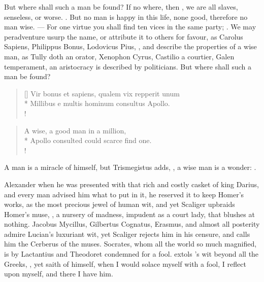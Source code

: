 But where shall such a man be found? If no where, then , we
are all slaves, senseless, or worse. . But no man is
happy in this life, none good, therefore no man wise. --- For one virtue you shall find ten vices in the same party;
. We may peradventure usurp the name,
or attribute it to others for favour, as Carolus Sapiens, Philippus
Bonus, Lodovicus Pius, \etc{}, and describe the properties of a wise man,
as Tully doth an orator, Xenophon Cyrus, Castilio a courtier, Galen
temperament, an aristocracy is described by politicians. But where
shall such a man be found?
%
\begin{latin}
\settowidth{\versewidth}{Vir bonus et sapiens, qualem vix repperit unum}
\begin{verse}[\versewidth]
Vir bonus et sapiens, qualem vix repperit unum\\*
Millibus e multis hominum consultus Apollo.\\!
\end{verse}
\end{latin}
\translationrule
\begin{verse}
A wise, a good man in a million,\\*
Apollo consulted could scarce find one.\\!
\end{verse}

A man is a miracle of himself, but Trismegistus adds, , a wise man is a wonder: .

Alexander when he was presented with that rich and costly casket of
king Darius, and every man advised him what to put in it, he reserved
it to keep Homer's works, as the most precious jewel of human wit, and
yet  Scaliger upbraids Homer's muse, ,
a nursery of madness, impudent as a court lady, that blushes at
nothing. Jacobus Mycillus, Gilbertus Cognatus, Erasmus, and almost all
posterity admire Lucian's luxuriant wit, yet Scaliger rejects him in
his censure, and calls him the Cerberus of the muses. Socrates, whom
all the world so much magnified, is by Lactantius and Theodoret
condemned for a fool.  extols \Seneca's wit beyond all the
Greeks, , yet  \Seneca saith of himself, when I would
solace myself with a fool, I reflect upon myself, and there I have him.


